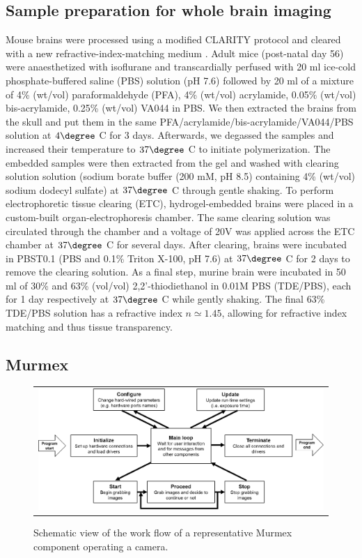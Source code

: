 \documentclass[12pt]{spieman}  %
\begin{document}
\subsection{Sample preparation for whole brain imaging}
Mouse brains were processed using a modified CLARITY protocol \cite{Chung2013} and cleared with a new refractive-index-matching medium \cite{Costantini}. Adult mice (post-natal day 56) were anaesthetized with isoflurane and transcardially perfused with 20 ml ice-cold phosphate-buffered saline (PBS) solution (pH 7.6) followed by 20 ml of a mixture of 4\% (wt/vol) paraformaldehyde (PFA), 4\% (wt/vol) acrylamide, 0.05\% (wt/vol) bis-acrylamide, 0.25\% (wt/vol) VA044 in PBS. We then extracted the brains from the skull and put them in the same PFA/acrylamide/bis-acrylamide/VA044/PBS solution at $4 \degree$ C for 3 days. Afterwards, we degassed the samples and increased their temperature to $37 \degree$ C to initiate polymerization. The embedded samples were then extracted from the gel and washed with clearing solution solution (sodium borate buffer (200 mM, pH 8.5) containing 4\% (wt/vol) sodium dodecyl sulfate) at $37 \degree $ C through gentle shaking. To perform electrophoretic tissue clearing (ETC), hydrogel-embedded brains were placed in a custom-built organ-electrophoresis chamber. The same clearing solution was circulated through the chamber and a voltage of 20V was applied across the ETC chamber at $37 \degree$ C for several days. After clearing, brains were incubated in PBST0.1 (PBS and 0.1\% Triton X-100, pH 7.6) at $37 \degree$ C for 2 days to remove the clearing solution. As a final step, murine brain were incubated in 50 ml of 30\% and 63\% (vol/vol) 2,2'-thiodiethanol in 0.01M PBS (TDE/PBS), each for 1 day respectively at $37 \degree$ C while gently shaking. The final 63\% TDE/PBS solution has a refractive index $n\simeq 1.45$, allowing for refractive index matching and thus tissue transparency.



\subsection{Murmex}
\label{sec:murmex}
	\begin{figure}
   \begin{center}
   \begin{tabular}{c}
   \includegraphics[width=\textwidth]{murmex.eps}
   \end{tabular}
   \end{center}
   \caption{\label{fig:murmex} Schematic view of the work flow of a representative Murmex component operating a camera.} 
   \end{figure}
\end{document}
